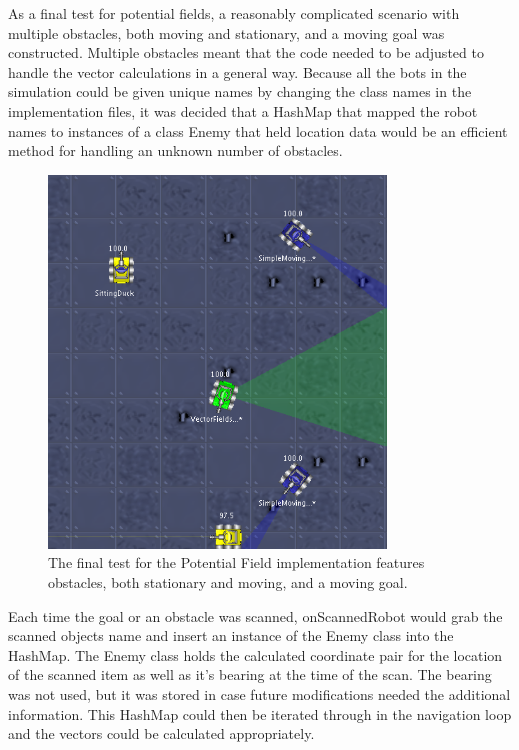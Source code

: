 \documentclass{aiaa-tc}%
\begin{document}
As a final test for potential fields, a reasonably complicated scenario with multiple obstacles, both moving and stationary, and a moving goal was constructed. Multiple obstacles meant that the code needed to be adjusted to handle the vector calculations in a general way. Because all the bots in the simulation could be given unique names by changing the class names in the implementation files, it was decided that a HashMap that mapped the robot names to instances of a class Enemy that held location data would be an efficient method for handling an unknown number of obstacles. 
\begin{figure}[htb]
\centering
\includegraphics[width=0.8\textwidth]{images/FinalRun}
\caption{The final test for the Potential Field implementation features obstacles, both stationary and moving, and a moving goal.}
\label{Radar Lock Example}
\end{figure} 
\clearpage
\noindent
Each time the goal or an obstacle was scanned, onScannedRobot would grab the scanned objects name and insert an instance of the Enemy class into the HashMap. The Enemy class holds the calculated coordinate pair for the location of the scanned item as well as it's bearing at the time of the scan. The bearing was not used, but it was stored in case future modifications needed the additional information. This HashMap could then be iterated through in the navigation loop and the vectors could be calculated appropriately. \\ \\
\end{document}
